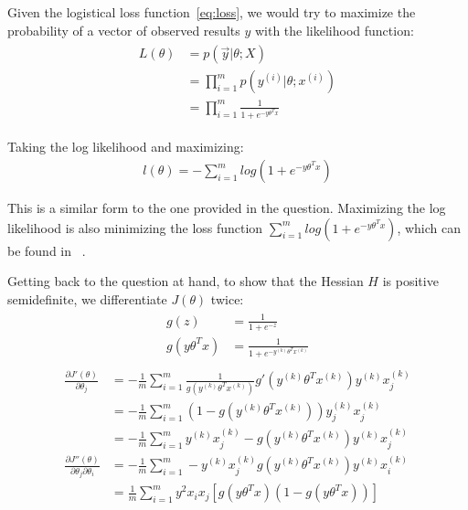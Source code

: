 \documentclass[11pt]{article}
\begin{document}
Given the logistical loss function~\ref{eq:loss}, we would try to maximize the probability of a vector of 
observed results $y$ with the likelihood function:
\begin{align}
		\begin{split}
				L(\theta) &= p(\vec{y}| \theta; X) \\
				&=\prod_{i=1}^{m}p(y^{(i)}|\theta;x^{(i)}) \\
				&=\prod_{i=1}^{m}\frac{1}{1+e^{-y\theta^Tx}}
		\end{split}
\end{align}

Taking the log likelihood and maximizing:
\begin{align}
		l(\theta) = -\sum_{i=1}^{m}log(1+e^{-y\theta^Tx})
\end{align}

This is a similar form to the one provided in the question. Maximizing the log likelihood is also minimizing
the loss function $\sum_{i=1}^{m}log(1+e^{-y\theta^Tx})$, which can be found in ~\cite{logisticloss}.

Getting back to the question at hand, to show that the Hessian $H$ is positive semidefinite, we 
differentiate $J(\theta)$ twice:
\begin{align}
		\begin{split}
	g(z) &= \frac{1}{1+e^{-z}} \\
		g(y\theta^Tx) &= \frac{1}{1+e^{-y^{(k)}\theta^Tx^{(k)}}}
		\end{split}
\end{align}
\begin{align}
		\begin{split}
		\frac{\partial J'(\theta)}{\partial \theta_j} &= -\frac{1}{m}\sum_{i=1}^{m}\frac{1}{g(y^{(k)}\theta^Tx^{(k)})}g'(y^{(k)}\theta^Tx^{(k)})y^{(k)}x^{(k)}_j \\
		&= -\frac{1}{m}\sum_{i=1}^{m}(1-g(y^{(k)}\theta^Tx^{(k)}))y^{(k)}_jx^{(k)}_j \\
		&= -\frac{1}{m}\sum_{i=1}^{m}y^{(k)}x^{(k)}_j-g(y^{(k)}\theta^Tx^{(k)})y^{(k)}x^{(k)}_j \\
		\frac{\partial J''(\theta)}{\partial \theta_j \partial \theta_i} &= -\frac{1}{m}\sum_{i=1}^{m}-y^{(k)}x^{(k)}_jg(y^{(k)}\theta^Tx^{(k)})y^{(k)}x^{(k)}_i \\
																		 &= \frac{1}{m}\sum_{i=1}^{m}y^2x_ix_j[g(y\theta^Tx)(1-g(y\theta^Tx))]
		\end{split}
\end{align}
\end{document}

